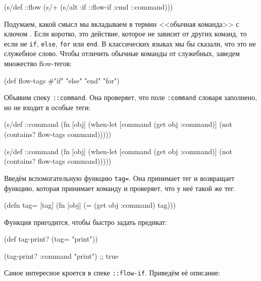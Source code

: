 \begin{clojure}
(s/def ::flow
  (s/+ (s/alt :if ::flow-if
              :cmd ::command)))
\end{clojure}

Подумаем, какой смысл мы вкладываем в термин <<обычная команда>> с ключом
. Если коротко, это действие, которое не зависит от других команд, то
если не \texttt{if}, \texttt{else}, \texttt{for} или \texttt{end}. В
классических языках мы бы сказали, что это не служебное слово. Чтобы отличить
обычные команды от служебных, заведем множество flow-тегов:

\label{flow-tags}

\begin{clojure}
(def flow-tags #{"if" "else" "end" "for"})
\end{clojure}

Объявим спеку \texttt{::command}. Она проверяет, что поле \texttt{:command}
словаря заполнено, но не входит в особые теги:

\ifnarrow

\begin{clojure}
(s/def ::command
  (fn [obj]
    (when-let [command (get obj :command)]
      (not (contains?
              flow-tags command)))))
\end{clojure}

\else

\begin{clojure}
(s/def ::command
  (fn [obj]
    (when-let [command (get obj :command)]
      (not (contains? flow-tags command)))))
\end{clojure}

\fi

Введём вспомогательную функцию \texttt{tag=}. Она принимает тег и возвращает
функцию, которая принимает команду и проверяет, что у неё такой же тег.

\begin{clojure}
(defn tag= [tag]
  (fn [obj]
    (= (get obj :command) tag)))
\end{clojure}

\noindent
Функция пригодится, чтобы быстро задать предикат:

\begin{clojure}
(def tag-print? (tag= "print"))

(tag-print? {:command "print"})
;; true
\end{clojure}

Самое интересное кроется в спеке \texttt{::flow-if}. Приведём её описание:

